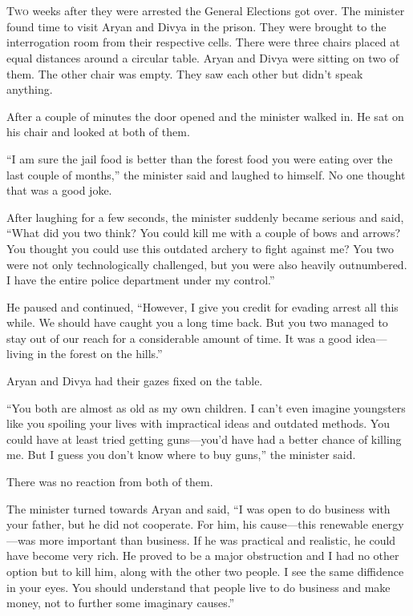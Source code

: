 \chapter{}

\lettrine{T}{wo} weeks after they were arrested the General Elections got over. The minister
found time to visit Aryan and Divya in the prison. They were brought to the
interrogation room from their respective cells. There were three chairs placed
at equal distances around a circular table. Aryan and Divya were sitting on two
of them. The other chair was empty. They saw each other but didn't speak
anything.

After a couple of minutes the door opened and the minister walked in. He sat on
his chair and looked at both of them.

“I am sure the jail food is better than the forest food you were eating over the
last couple of months,” the minister said and laughed to himself. No one thought
that was a good joke.

After laughing for a few seconds, the minister suddenly became serious and said,
“What did you two think? You could kill me with a couple of bows and arrows? You
thought you could use this outdated archery to fight against me? You two were
not only technologically challenged, but you were also heavily outnumbered. I
have the entire police department under my control.”

He paused and continued, “However, I give you credit for evading arrest all this
while. We should have caught you a long time back. But you two managed to stay
out of our reach for a considerable amount of time. It was a good idea—living
in the forest on the hills.”

Aryan and Divya had their gazes fixed on the table.

“You both are almost as old as my own children. I can't even imagine youngsters
like you spoiling your lives with impractical ideas and outdated methods. You
could have at least tried getting guns—you'd have had a better chance of
killing me. But I guess you don't know where to buy guns,” the minister said.

There was no reaction from both of them.

The minister turned towards Aryan and said, “I was open to do business with your
father, but he did not cooperate. For him, his cause—this renewable energy—was
more important than business. If he was practical and realistic, he could
have become very rich. He proved to be a major obstruction and I had no other
option but to kill him, along with the other two people. I see the same
diffidence in your eyes. You should understand that people live to do business
and make money, not to further some imaginary causes.”


